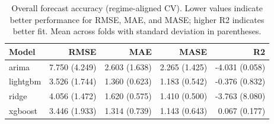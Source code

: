\begin{table}
\caption{Overall forecast accuracy (regime-aligned CV). Lower values indicate better performance for RMSE, MAE, and MASE; higher R2 indicates better fit. Mean across folds with standard deviation in parentheses.}
\begin{tabular}{lrrrr}
\toprule
Model & RMSE & MAE & MASE & R2 \\
\midrule
arima & 7.750 (4.249) & 2.603 (1.638) & 2.265 (1.425) & -4.031 (0.058) \\
lightgbm & 3.526 (1.744) & 1.360 (0.623) & 1.183 (0.542) & -0.376 (0.832) \\
ridge & 4.056 (1.472) & 1.620 (0.575) & 1.410 (0.500) & -3.763 (8.080) \\
xgboost & 3.446 (1.933) & 1.314 (0.739) & 1.143 (0.643) & 0.067 (0.177) \\
\bottomrule
\end{tabular}
\end{table}